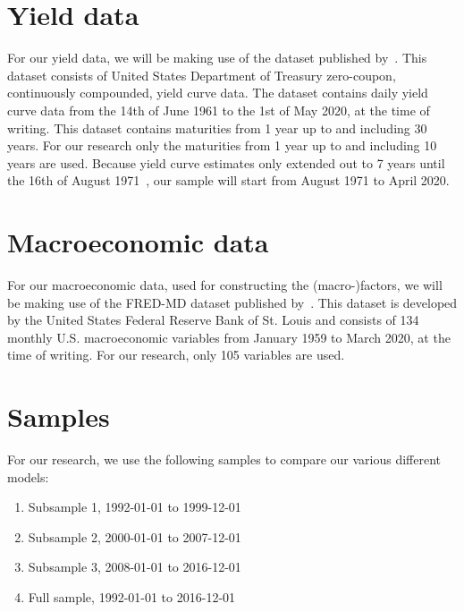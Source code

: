 \section{Yield data}
For our yield data, we will be making use of the dataset published by~\textcite{Grkaynak2007}. 
This dataset consists of United States Department of Treasury zero-coupon, continuously compounded, yield curve data. 
The dataset contains daily yield curve data from the 14th of June 1961 to the 1st of May 2020, at the time of writing. 
This dataset contains maturities from 1 year up to and including 30 years. 
For our research only the maturities from 1 year up to and including 10 years are used. 
Because yield curve estimates only extended out to 7 years until the 16th of August 1971~\parencite[see][p.~19]{Grkaynak2007}, our sample will start from August 1971 to April 2020. 

\section{Macroeconomic data}
For our macroeconomic data, used for constructing the (macro-)factors, we will be making use of the FRED-MD dataset published by~\textcite{McCracken2016}. 
This dataset is developed by the United States Federal Reserve Bank of St. Louis and consists of 134 monthly U.S. macroeconomic variables from January 1959 to March 2020, at the time of writing. 
For our research, only 105 variables are used.

\section{Samples}
For our research, we use the following samples to compare our various different models:
\begin{enumerate}
	\item Subsample 1, 1992-01-01 to 1999-12-01
	\item Subsample 2, 2000-01-01 to 2007-12-01
	\item Subsample 3, 2008-01-01 to 2016-12-01
	\item Full sample, 1992-01-01 to 2016-12-01
\end{enumerate}
